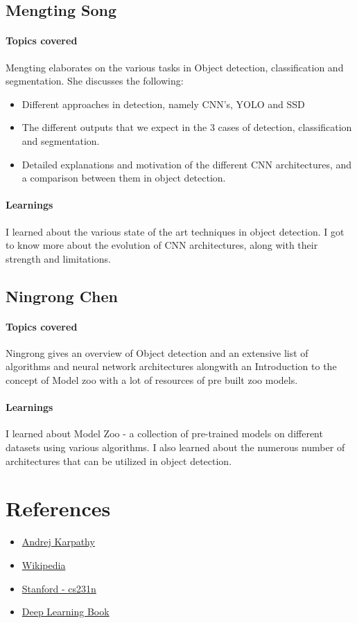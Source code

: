 \documentclass{article}
\begin{document}
		\subsection{Mengting Song}
			\paragraph{Topics covered}
			Mengting elaborates on the various tasks in Object detection, classification and segmentation. She discusses the following:
			\begin{itemize}
				\item Different approaches in detection, namely CNN's, YOLO and SSD
				\item The different outputs that we expect in the 3 cases of detection, classification and segmentation.
				\item Detailed explanations and motivation of the different CNN architectures, and a comparison between them in object detection.
			\end{itemize}
			\paragraph{Learnings}
			I learned about the various state of the art techniques in object detection. I got to know more about the evolution of CNN architectures, along with their strength and limitations.
			
		\subsection{Ningrong Chen}
			\paragraph{Topics covered}
			Ningrong gives an overview of Object detection and an extensive list of algorithms and neural network architectures alongwith an Introduction to the concept of Model zoo with a lot of resources of pre built zoo models.
			\paragraph{Learnings}
			I learned about Model Zoo - a collection of pre-trained models on different datasets using various algorithms. I also learned about the numerous number of architectures that can be utilized in object detection.
			
	\section{References}
		\begin{itemize}
			\item \href{https://www.youtube.com/watch?v=u6aEYuemt0M\&t=524s}{Andrej Karpathy}
			\item \href{https://en.wikipedia.org/wiki/Computer_vision}{Wikipedia}
			\item \href{https://cs231n.github.io/}{Stanford - cs231n}
			\item \href{http://www.deeplearningbook.org}{Deep Learning Book}
		\end{itemize}
		
	
			
		
\end{document}
